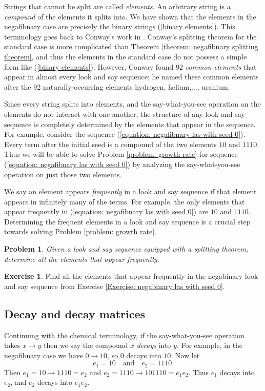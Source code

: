 \documentclass[reqno]{amsart}
\newtheorem{problem}{Problem}
\theoremstyle{definition}
\newtheorem{exercise}[theorem]{Exercise}
\begin{document}
Strings that cannot be split are called \emph{elements}. An arbitrary string is a \emph{compound} of the elements it splits into. We have shown that the elements in the negafibnary case are precisely the binary strings (\ref{binary elements}). This terminology goes back to Conway's work in \cite{Conway}. Conway's splitting theorem for the standard case is more complicated than Theorem \ref{theorem: negafibnary splitting theorem}, and thus the elements in the standard case do not possess a simple form like (\ref{binary elements}). However, Conway found 92 \emph{common elements} that appear in almost every look and say sequence; he named these common elements after the 92 naturally-occurring elements hydrogen, helium,$\ldots$, uranium. 

Since every string splits into elements, and the say-what-you-see operation on the elements do not interact with one another, the structure of any look and say sequence is completely determined by the elements that appear in the sequence. For example, consider the sequence (\ref{equation: negafibnary las with seed 0}). Every term after the initial seed is a compound of the two elements $10$ and $1110$. Thus we will be able to solve Problem \ref{problem: growth rate} for sequence (\ref{equation: negafibnary las with seed 0}) by analyzing the say-what-you-see operation on just those two elements. 

We say an element appears \emph{frequently} in a look and say sequence if that element appears in infinitely many of the terms. For example, the only elements that appear frequently in (\ref{equation: negafibnary las with seed 0}) are $10$ and $1110$. Determining the frequent elements in a look and say sequence is a crucial step towards solving Problem \ref{problem: growth rate}.

\begin{problem}\label{problem::find frequent elements}
    Given a look and say sequence equipped with a splitting theorem, determine all the elements that appear frequently. 
\end{problem}


\begin{exercise}\label{Exercise: negabinary elements from seed 0}
    Find all the elements that appear frequently in the negabinary look and say sequence from Exercise \ref{Exercise: negabinary las with seed 0}. 
\end{exercise}

\subsection{Decay and decay matrices}\label{subsection::decay}
Continuing with the chemical terminology, if the say-what-you-see operation takes $x\to y$ then we say the compound $x$ \emph{decays} into $y$. For example, in the negafibnary case we have $0\to 10$, so $0$ decays into $10$. Now let 
\begin{equation}\label{negafibnary two common elements}
    e_1=10\quad\text{and}\quad e_2=1110.
\end{equation} 
Then $e_1=10\to 1110=e_2$ and $e_2=1110\to 101110=e_1e_2$. Thus $e_1$ decays into $e_2$, and $e_2$ decays into $e_1e_2$.
\end{document}
